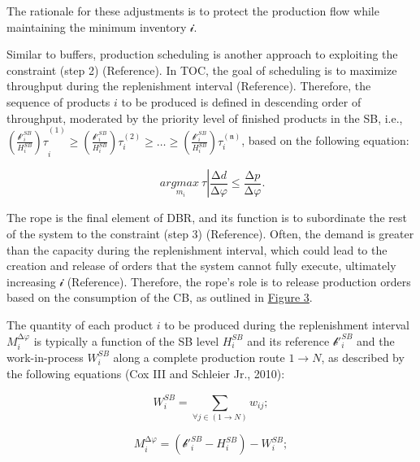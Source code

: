 The rationale for these adjustments is to protect the production flow
while maintaining the minimum inventory \(\mathcal{i}\).

Similar to buffers, production scheduling is another approach to
exploiting the constraint (step 2) (\colorbox{yellow!40}{Reference}). In TOC, the goal of
scheduling is to maximize throughput during the replenishment interval
(\colorbox{yellow!40}{Reference}). Therefore, the sequence of products \(i\) to be
produced is defined in descending order of throughput, moderated by the
priority level of finished products in the SB, i.e.,
\({\left( \frac{\mathcal{b'}_{i}^{SB}}{H_{i}^{SB}} \right)\tau}_{i}^{(1)} \geq \left( \frac{\mathcal{b'}_{i}^{SB}}{H_{i}^{SB}} \right)\tau_{i}^{(2)} \geq \ldots \geq \left( \frac{\mathcal{b'}_{i}^{SB}}{H_{i}^{SB}} \right)\tau_{i}^{(\mathfrak{n})}\),
based on the following equation:

\begin{equation}
\left. \ \underset{m_{i}}{argmax\ }\tau \right|\frac{\mathrm{\Delta}d}{\mathrm{\Delta}\varphi} \leq \frac{\mathrm{\Delta}p}{\mathrm{\Delta}\varphi}.
\tag{15}
\end{equation}

The rope is the final element of DBR, and its function is to subordinate
the rest of the system to the constraint (step 3) (\colorbox{yellow!40}{Reference}).
Often, the demand is greater than the capacity during the replenishment
interval, which could lead to the creation and release of orders that
the system cannot fully execute, ultimately increasing \(\mathcal{i}\)
(\colorbox{yellow!40}{Reference}). Therefore, the rope's role is to release production
orders based on the consumption of the CB, as outlined in
\colorbox{yellow!40}{\hyperref[_Ref187516903]{Figure 3}}.

The quantity of each product \(i\) to be produced during the
replenishment interval \(M_{i}^{\mathrm{\Delta}\varphi}\) is typically a
function of the SB level \(H_{i}^{SB}\) and its reference
\(\mathcal{b'}_{i}^{SB}\) and the work-in-process \(W_{i}^{SB}\) along a
complete production route \(1 \rightarrow N\), as described by the
following equations (Cox III and Schleier Jr., 2010):

\begin{equation}
W_{i}^{SB} = \sum_{\forall j \in (1 \rightarrow N)}^{}w_{ij};
\tag{16}
\end{equation}

\begin{equation}
M_{i}^{\mathrm{\Delta}\varphi} = \left( \mathcal{b'}_{i}^{SB} - H_{i}^{SB} \right) - W_{i}^{SB};
\tag{17}
\end{equation}

